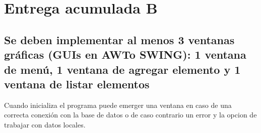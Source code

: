 \renewcommand\thesection{\Alph{section}}
\renewcommand\thesubsection{\thesection.\arabic{subsection}}
\setcounter{section}{1}
\section{Entrega acumulada B}

\setcounter{subsection}{1}
\subsection{Se deben implementar al menos 3 ventanas gráficas (GUIs en AWTo SWING): 1 ventana de menú, 1 ventana de agregar elemento y 1 ventana de listar elementos}

Cuando inicializa el programa puede emerger una ventana en caso de una correcta conexión con la base de datos o de caso contrario un error y la opcion de trabajar con datos locales.

\begin{multicols}{2}

    \columnbreak

\end{multicols}

